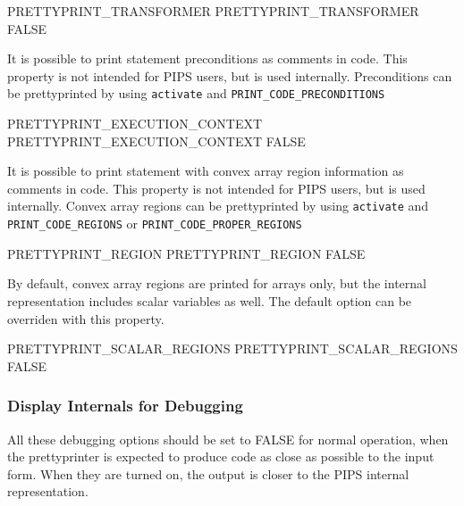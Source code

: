 \documentclass[a4paper]{report}
\begin{document}
\begin{PipsProp}{PRETTYPRINT_TRANSFORMER}
PRETTYPRINT_TRANSFORMER FALSE
\end{PipsProp}

It is possible to print statement preconditions as comments in
code. This property is not intended for PIPS users, but is used
internally. Preconditions can be prettyprinted by using \verb/activate/
and \verb/PRINT_CODE_PRECONDITIONS/

\begin{PipsProp}{PRETTYPRINT_EXECUTION_CONTEXT}
PRETTYPRINT_EXECUTION_CONTEXT FALSE
\end{PipsProp}

It is possible to print statement with convex array region information as comments in
code. This property is not intended for PIPS users, but is used
internally. Convex array regions can be prettyprinted by using \verb/activate/
and \verb/PRINT_CODE_REGIONS/ or \verb/PRINT_CODE_PROPER_REGIONS/

\begin{PipsProp}{PRETTYPRINT_REGION}
PRETTYPRINT_REGION FALSE
\end{PipsProp}

By default, convex array regions are printed for arrays only, but the
internal representation includes scalar variables as well. The default
option can be overriden with this property.

\begin{PipsProp}{PRETTYPRINT_SCALAR_REGIONS}
PRETTYPRINT_SCALAR_REGIONS FALSE
\end{PipsProp}


\subsubsection{Display Internals for Debugging}

All these debugging options should be set to FALSE for normal operation,
when the prettyprinter is expected to produce code as close as possible to
the input form.
When they are turned on, the output is closer to the PIPS internal
representation.
\end{document}
